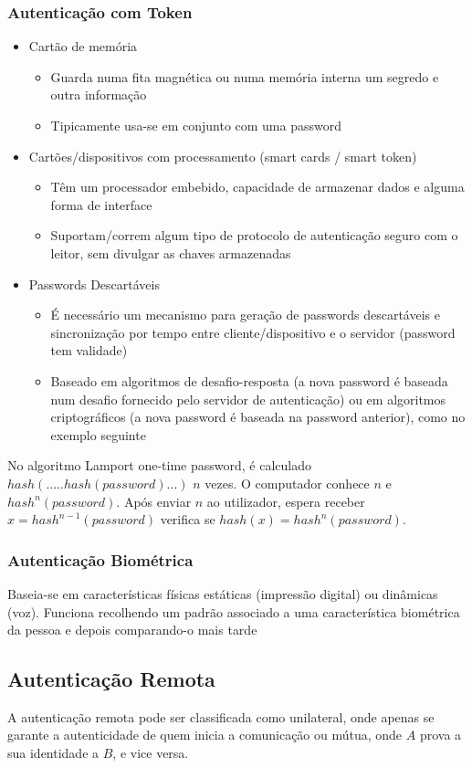 \documentclass[10pt,a4paper]{report}
\begin{document}
\subsubsection{Autenticação com Token}
\begin{itemize}
\item Cartão de memória
\begin{itemize}
\item Guarda numa fita magnética ou numa memória interna um segredo e outra informação
\item Tipicamente usa-se em conjunto com uma password
\end{itemize}
\item Cartões/dispositivos com processamento (smart cards / smart token)
\begin{itemize}
\item Têm um processador embebido, capacidade de armazenar dados e alguma forma de interface
\item Suportam/correm algum tipo de protocolo de autenticação seguro com o leitor, sem divulgar as chaves armazenadas
\end{itemize}
\item Passwords Descartáveis
\begin{itemize}
\item É necessário um mecanismo para geração de passwords descartáveis e sincronização por tempo entre cliente/dispositivo e o servidor (password tem validade)
\item Baseado em algoritmos de desafio-resposta (a nova password é baseada num desafio fornecido pelo servidor de autenticação) ou em algoritmos criptográficos (a nova password é baseada na password anterior), como no exemplo seguinte
\end{itemize}
\end{itemize}
No algoritmo Lamport one-time password, é calculado $hash(.....hash(password)...)$ $n$ vezes. O computador conhece $n$ e $hash^n(password)$. Após enviar $n$ ao utilizador, espera receber $x = hash^{n-1}(password)$ verifica se $hash(x) = hash^n(password)$.
\subsubsection{Autenticação Biométrica}
Baseia-se em características físicas estáticas (impressão digital) ou dinâmicas (voz). Funciona recolhendo um padrão associado a uma característica biométrica da pessoa e depois comparando-o mais tarde
\subsection{Autenticação Remota}
A autenticação remota pode ser classificada como unilateral, onde apenas se garante a autenticidade de quem inicia a comunicação ou mútua, onde $A$ prova a sua identidade a $B$, e vice versa.
\end{document}
